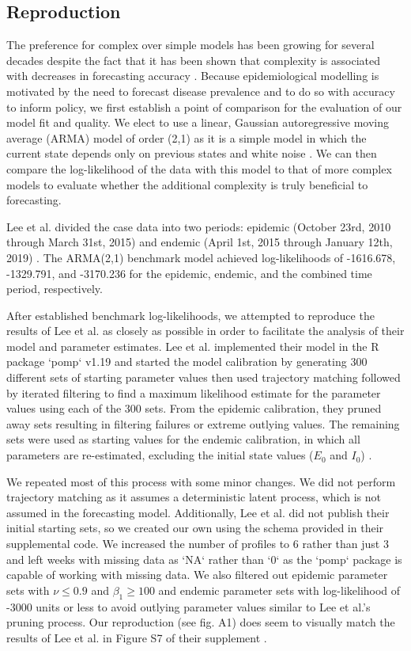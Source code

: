 \documentclass[12pt]{article}
\begin{document}
\subsection{Reproduction}

  The preference for complex over simple models has been growing for several decades despite the fact that it has been shown that complexity is associated with decreases in forecasting accuracy \cite{Green}. Because epidemiological modelling is motivated by the need to forecast disease prevalence and to do so with accuracy to inform policy, we first establish a point of comparison for the evaluation of our model fit and quality. We elect to use a linear, Gaussian autoregressive moving average (ARMA) model of order (2,1) as it is a simple model in which the current state depends only on previous states and white noise \cite{Shumway_ch3}. We can then compare the log-likelihood of the data with this model to that of more complex models to evaluate whether the additional complexity is truly beneficial to forecasting. 
  
  Lee et al. divided the case data into two periods: epidemic (October 23rd, 2010 through March 31st, 2015) and endemic (April 1st, 2015 through January 12th, 2019) \cite{Lee_supp}. The ARMA(2,1) benchmark model achieved log-likelihoods of -1616.678, -1329.791, and -3170.236 for the epidemic, endemic, and the combined time period, respectively.
  
 After established benchmark log-likelihoods, we attempted to reproduce the results of Lee et al. as closely as possible in order to facilitate the analysis of their model and parameter estimates. Lee et al. implemented their model in the R package `pomp` v1.19 and started the model calibration by generating 300 different sets of starting parameter values then used trajectory matching followed by iterated filtering to find a maximum likelihood estimate for the parameter values using each of the 300 sets. From the epidemic calibration, they pruned away sets resulting in filtering failures or extreme outlying values. The remaining sets were used as starting values for the endemic calibration, in which all parameters are re-estimated, excluding the initial state values ($E_0$ and $I_0$) \cite{Lee_supp}.

  We repeated most of this process with some minor changes. We did not perform trajectory matching as it assumes a deterministic latent process, which is not assumed in the forecasting model. Additionally, Lee et al. did not publish their initial starting sets, so we created our own using the schema provided in their supplemental code. We increased the number of profiles to 6 rather than just 3 and left weeks with missing data as `NA` rather than `0` as the `pomp` package is capable of working with missing data. We also filtered out epidemic parameter sets with $\nu \leq 0.9$ and $\beta_1 \geq 100$ and endemic parameter sets with log-likelihood of -3000 units or less to avoid outlying parameter values similar to Lee et al.'s pruning process. Our reproduction (see fig. A1) does seem to visually match the results of Lee et al. in Figure S7 of their supplement \cite{Lee_supp}. 
\end{document}
